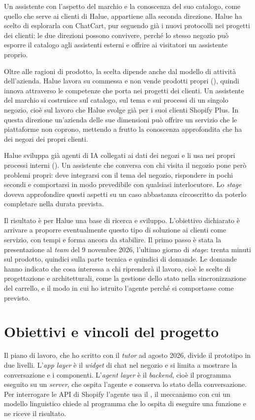 Un assistente con l’aspetto del marchio e la conoscenza del suo catalogo, come quello che serve ai
clienti di Halue, appartiene alla seconda direzione.
Halue ha scelto di esplorarla con ChatCart, pur seguendo già i nuovi protocolli nei progetti dei
clienti: le due direzioni possono convivere, perché lo stesso negozio può esporre il catalogo agli
assistenti esterni e offrire ai visitatori un assistente proprio.

Oltre alle ragioni di prodotto, la scelta dipende anche dal
modello di attività dell’azienda. Halue lavora su commessa e non vende prodotti propri
(), quindi innova attraverso le competenze che porta nei progetti dei clienti.
Un assistente del marchio si costruisce sul catalogo, sul tema e sui processi di un singolo
negozio, cioè sul lavoro che Halue svolge già per i suoi clienti Shopify Plus. In questa direzione
un’azienda delle sue dimensioni può offrire un servizio che le piattaforme non coprono, mettendo a
frutto la conoscenza approfondita che ha dei negozi dei propri clienti.

Halue sviluppa già agenti di IA collegati ai dati dei negozi e li usa nei propri processi interni
(). Un assistente che conversa con chi visita il negozio pone però problemi
propri: deve
integrarsi con il tema del negozio, rispondere in pochi secondi e comportarsi in modo prevedibile
con qualsiasi interlocutore. Lo \emph{stage} doveva approfondire questi aspetti su un caso
abbastanza circoscritto da poterlo completare nella durata prevista.

Il risultato è per Halue una base di ricerca e sviluppo. L’obiettivo dichiarato è arrivare a
proporre eventualmente questo tipo di soluzione ai clienti come servizio, con tempi e forma ancora
da stabilire. Il primo passo è stata la presentazione al \emph{team} del 9 novembre 2026, l’ultimo
giorno di \emph{stage}: trenta minuti sul prodotto, quindici sulla parte tecnica e quindici di
domande. Le domande hanno indicato che cosa interessa a chi riprenderà il lavoro, cioè le scelte di
progettazione e architetturali, come la gestione dello stato nella sincronizzazione del carrello,
e il modo in cui ho istruito l’agente perché si comportasse come previsto.

\section{Obiettivi e vincoli del progetto}
\label{sec:obiettivi}

Il piano di lavoro, che ho scritto con il \emph{tutor} ad agosto 2026, divide il prototipo in due
livelli. L’\emph{app layer} è il \emph{widget} di chat nel negozio e si limita a mostrare la
conversazione e i componenti. L’\emph{agent layer} è il \emph{backend}, cioè il programma eseguito
su un \emph{server}, che ospita l’agente e conserva lo stato della conversazione. Per interrogare le
API di Shopify l’agente usa il , il meccanismo con cui un
modello linguistico chiede al programma che lo ospita di eseguire una funzione e ne riceve il
risultato.

